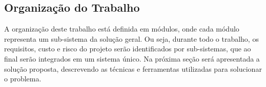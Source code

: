 
\subsection{Organização do Trabalho} %
\label{sub:organização_do_trabalho}
	A organização deste trabalho está definida em módulos, onde cada módulo representa um sub-sistema da solução geral. Ou seja, durante todo o trabalho, os requisitos, custo e risco do projeto serão identificados por sub-sistemas, que ao final serão integrados em um sistema único. Na próxima seção será apresentada a solução proposta, descrevendo as técnicas e ferramentas utilizadas para solucionar o problema. 
